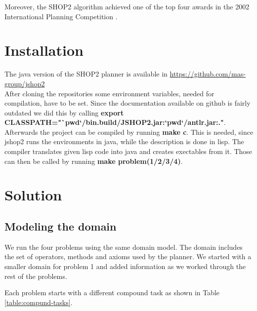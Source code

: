 \documentclass[paper=a4, fontsize=11pt]{scrartcl}
\begin{document}
 	Moreover, the SHOP2 algorithm achieved one of the top four awards in the 2002 International Planning Competition \cite{Nau2003}.
 	
 	\section{Installation}
 	
 	The java version of the SHOP2 planner is available in \url{https://github.com/mas-group/jshop2} \\
 	
 	After cloning the repositories some environment variables, needed for compilation, have to be set. Since the documentation available on github is fairly outdated we did this by calling \textbf{export CLASSPATH="`pwd`/bin.build/JSHOP2.jar:`pwd`/antlr.jar:."}. Afterwards the project can be compiled by running \textbf{make c}. This is needed, since jshop2 runs the environments in java, while the description is done in lisp. The compiler translates given lisp code into java and creates exectables from it.
 	Those can then be called by running \textbf{make problem(1/2/3/4)}.


	
	\section{Solution}
	
	\subsection{Modeling the domain}
	
	We run the four problems using the same domain model. The domain includes the set of operators, methods and axioms used by the planner. We started with a smaller domain for problem 1 and added information as we worked through the rest of the problems. 
	
	Each problem starts with a different compound task as shown in Table \ref{table:compund-tasks}.
	
\end{document}
